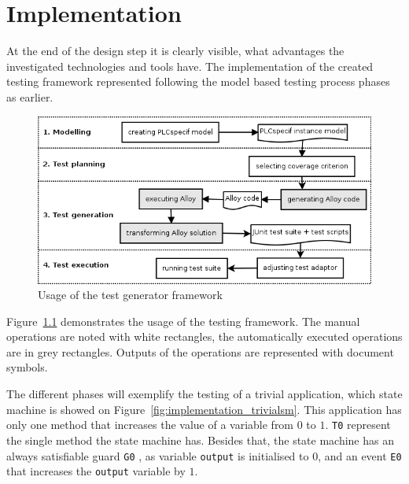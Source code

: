 \chapter{Implementation}
\label{cha:implementation}

At the end of the design step it is clearly visible, what advantages the investigated technologies and tools have. The implementation of the created testing framework represented following the model based testing process phases as earlier.

\begin{figure}[htp]
\centering
\includegraphics[scale=0.6]{figures/implementation_usage}
\caption{Usage of the test generator framework}
\label{fig:implementation_usage}
\end{figure}

Figure~\ref{fig:implementation_usage} demonstrates the usage of the testing framework. The manual operations are noted with white rectangles, the automatically executed operations are in grey rectangles. Outputs of the operations are represented with document symbols.

The different phases will exemplify the testing of a trivial application, which state machine is showed on Figure~\ref{fig:implementation_trivialsm}. This application has only one method that increases the value of a variable from $0$ to $1$. \texttt{T0} represent the single method the state machine has. Besides that, the state machine has an always satisfiable guard \texttt{G0} , as variable \texttt{output} is initialised to $0$, and an event \texttt{E0} that increases the \texttt{output} variable by $1$. 

